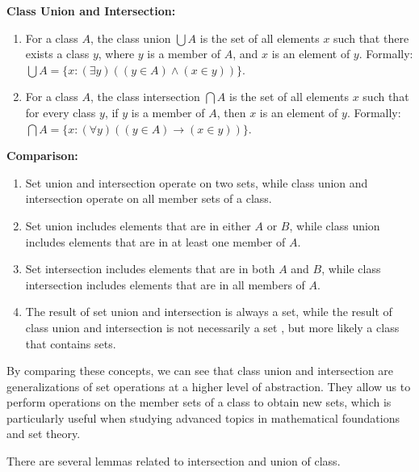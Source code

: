 \textbf{Class Union and Intersection:}
\begin{enumerate}
\item For a class $A$, the class union $\bigcup A$ is the set of all elements $x$ such that there exists a class $y$, where $y$ is a member of $A$, and $x$ is an element of $y$. Formally: $\bigcup A = \{x : (\exists y)((y \in A) \land (x \in y))\}$.
\item For a class $A$, the class intersection $\bigcap A$ is the set of all elements $x$ such that for every class $y$, if $y$ is a member of $A$, then $x$ is an element of $y$. Formally: $\bigcap A = \{x : (\forall y)((y \in A) \to (x \in y))\}$.
\end{enumerate}

\textbf{Comparison:}
\begin{enumerate}
\item Set union and intersection operate on two sets, while class union and intersection operate on all member sets of a class.
\item Set union includes elements that are in either $A$ or $B$, while class union includes elements that are in at least one member of $A$.
\item Set intersection includes elements that are in both $A$ and $B$, while class intersection includes elements that are in all members of $A$.
\item The result of set union and intersection is always a set, while the result of class union and intersection is not necessarily a set
, but more likely a class that contains sets.
\end{enumerate}

By comparing these concepts, we can see that class union and intersection are generalizations of set 
operations at a higher level of abstraction. They allow us to perform operations on the member sets of a 
class to obtain new sets, which is particularly useful when studying advanced topics in mathematical 
foundations and set theory.

There are several lemmas related to intersection and union of class.

